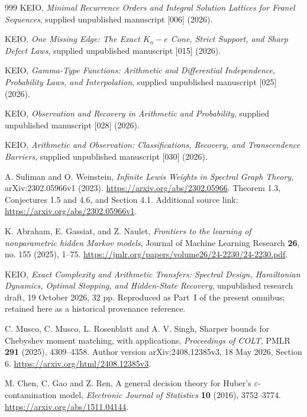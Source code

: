 \documentclass[11pt,a4paper]{article}
\theoremstyle{definition}
\theoremstyle{remark}
\numberwithin{equation}{section}
\begin{document}
\begin{thebibliography}{999}
KEIO,
\emph{Minimal Recurrence Orders and Integral Solution Lattices for Franel Sequences},
supplied unpublished manuscript [006] (2026).

KEIO,
\emph{One Missing Edge: The Exact $K_n-e$ Cone, Strict Support, and Sharp Defect Laws},
supplied unpublished manuscript [015] (2026).

KEIO,
\emph{Gamma-Type Functions: Arithmetic and Differential Independence, Probability Laws, and Interpolation},
supplied unpublished manuscript [025] (2026).

KEIO,
\emph{Observation and Recovery in Arithmetic and Probability},
supplied unpublished manuscript [028] (2026).

KEIO,
\emph{Arithmetic and Observation: Classifications, Recovery, and Transcendence Barriers},
supplied unpublished manuscript [030] (2026).

A. Suliman and O. Weinstein,
\emph{Infinite Lewis Weights in Spectral Graph Theory},
arXiv:2302.05966v1 (2023).
\url{https://arxiv.org/abs/2302.05966}.
Theorem 1.3, Conjectures 1.5 and 4.6, and Section 4.1.
Additional source link: \url{https://arxiv.org/abs/2302.05966v1}.

K. Abraham, E. Gassiat, and Z. Naulet,
\emph{Frontiers to the learning of nonparametric hidden Markov models},
Journal of Machine Learning Research \textbf{26}, no. 155 (2025), 1--75.
\url{https://jmlr.org/papers/volume26/24-2230/24-2230.pdf}.

KEIO,
\emph{Exact Complexity and Arithmetic Transfers: Spectral Design,
Hamiltonian Dynamics, Optimal Stopping, and Hidden-State Recovery},
unpublished research draft, 19 October 2026, 32 pp.
Reproduced as Part~I of the present omnibus; retained here as a historical provenance reference.

C. Musco, C. Musco, L. Rosenblatt and A. V. Singh,
Sharper bounds for Chebyshev moment matching, with applications,
\emph{Proceedings of COLT}, PMLR \textbf{291} (2025), 4309--4358.
Author version arXiv:2408.12385v3, 18 May 2026, Section 6.
\url{https://arxiv.org/html/2408.12385v3}.

M. Chen, C. Gao and Z. Ren,
A general decision theory for Huber's $\varepsilon$-contamination model,
\emph{Electronic Journal of Statistics} \textbf{10} (2016), 3752--3774.
\url{https://arxiv.org/abs/1511.04144}.


\end{thebibliography}
\end{document}
